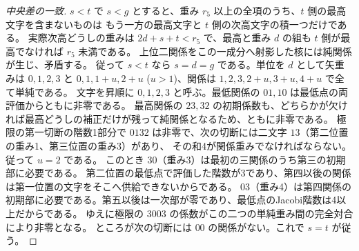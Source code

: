 \begin{proof}[中央差の一致]
$s<t$ で $s<g$ とすると、重み $r_5$ 以上の全項のうち、$t$ 側の最高文字を含まないものは
もう一方の最高文字と $t$ 側の次高文字の積一つだけである。
実際次高どうしの重みは $2d+s+t<r_5$ で、最高と重み $d$ の組も $t$ 側が最高でなければ $r_5$ 未満である。
上位二関係をこの一成分へ射影した核には純関係が生じ、矛盾する。
従って $s<t$ なら $s=d=g$ である。単位を $d$ として矢重みは
$0,1,2,3$ と $0,1,1+u,2+u$ ($u>1$)、関係は $1,2,3,2+u,3+u,4+u$ で全て単純である。
文字を昇順に $0,1,2,3$ と呼ぶ。最低関係の $01,10$ は最低点の両評価からともに非零である。
最高関係の $23,32$ の初期係数も、どちらかが欠ければ最高どうしの補正だけが残って純関係となるため、ともに非零である。
極限の第一切断の階数1部分で $0132$ は非零で、次の切断には二文字 $13$（第二位置の重み1、第三位置の重み3）があり、
その和4が関係重みでなければならない。従って $u=2$ である。
このとき $30$（重み3）は最初の三関係のうち第三の初期部に必要である。
第二位置の最低点で評価した階数が3であり、第四以後の関係は第一位置の文字をそこへ供給できないからである。
$03$（重み4）は第四関係の初期部に必要である。第五以後は一次部が零であり、最低点のJacobi階数は4以上だからである。
ゆえに極限の $3003$ の係数がこの二つの単純重み間の完全対合により非零となる。
ところが次の切断には $00$ の関係がない。これで $s=t$ が従う。
\end{proof}

